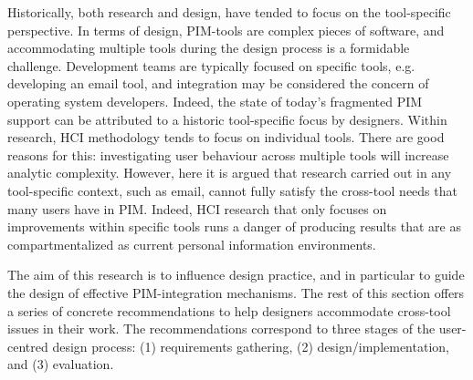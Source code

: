 Historically, both research and design, have tended to focus on the tool-specific perspective. 
In terms of design, PIM-tools are complex pieces of software, and accommodating multiple tools during the design process is a formidable challenge.  Development teams are typically focused on specific tools, e.g. developing an email tool, and integration may be considered the concern of operating system developers.  Indeed, the state of today's fragmented PIM support can be attributed to a historic tool-specific focus by designers.
Within research, HCI methodology tends to focus on individual tools.  There are good reasons for this: investigating user behaviour across multiple tools will increase analytic complexity. However, here it is argued that research carried out in any tool-specific context, such as email, cannot fully satisfy the cross-tool needs that many users have in PIM.  Indeed, HCI research that only focuses on improvements within specific tools runs a danger of producing results that are as compartmentalized as current personal information environments.  


The aim of this research is to influence design practice, and in particular to guide the design of effective PIM-integration mechanisms.   The rest of this section offers a series of concrete recommendations to help designers accommodate cross-tool issues in their work.  The recommendations correspond to three stages of the user-centred design process: (1) requirements gathering, (2) design/implementation, and (3) evaluation.  


